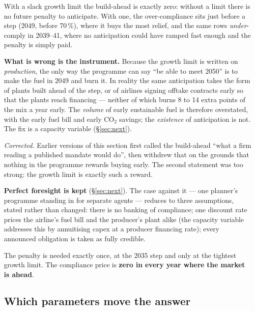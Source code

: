 \documentclass[11pt,a4paper]{article}
\begin{document}
\begin{keybox}
With a slack growth limit the build-ahead is exactly zero: without a limit there is no
future penalty to anticipate. With one, the over-compliance sits just before a step
(2049, before 70\,\%), where it buys the most relief, and the same rows
\emph{under}-comply in 2039--41, where no anticipation could have ramped fast enough and
the penalty is simply paid.

\medskip
\textbf{What is wrong is the instrument.} Because the growth limit is written on
\emph{production}, the only way the programme can say ``be able to meet 2050'' is to make
the fuel in 2049 and burn it. In reality the same anticipation takes the form of plants
built ahead of the step, or of airlines signing offtake contracts early so that the plants
reach financing --- neither of which burns 8 to 14 extra points of the mix a year early.
The \emph{volume} of early sustainable fuel is therefore overstated, with the early fuel
bill and early CO$_2$ savings; the \emph{existence} of anticipation is not. The fix is a
capacity variable (\S\ref{sec:next}).

\medskip
\emph{Corrected.} Earlier versions of this section first called the build-ahead ``what a
firm reading a published mandate would do'', then withdrew that on the grounds that
nothing in the programme rewards buying early. The second statement was too strong: the
growth limit is exactly such a reward.
\end{keybox}

\noindent \textbf{Perfect foresight is kept} (\S\ref{sec:next}). The case against it --- one
planner's programme standing in for separate agents --- reduces to three assumptions,
stated rather than changed: there is no banking of compliance; one discount rate prices the
airline's fuel bill and the producer's plant alike (the capacity variable addresses this by
annuitising capex at a producer financing rate); every announced obligation is taken as
fully credible.

The penalty is needed exactly once, at the 2035 step and only at the tightest growth
limit. The compliance price is \textbf{zero in every year where the market is ahead}.

\subsection{Which parameters move the answer}
\end{document}
